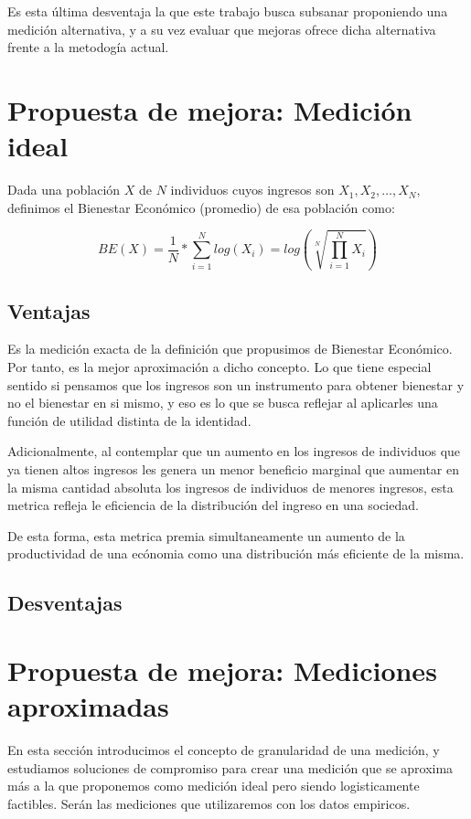 \documentclass[11pt,a4paper]{tesis}
\begin{document}
Es esta última desventaja la que este trabajo busca subsanar proponiendo una medición alternativa, y a su vez evaluar que mejoras ofrece dicha alternativa frente a la metodogía actual.

\section{Propuesta de mejora: Medición ideal}

Dada una población $X$ de $N$ individuos cuyos ingresos son $X_1, X_2, \dots, X_N$, definimos el Bienestar Económico (promedio) de esa población como:

$$
    BE(X) = \frac{1}{N} * \sum_{i=1}^N log(X_i) = log(\sqrt[N]{\prod_{i=1}^N X_i})
$$

\subsection{Ventajas}

Es la medición exacta de la definición que propusimos de Bienestar Económico. Por tanto, es la mejor aproximación a dicho concepto. Lo que tiene especial sentido si pensamos que los ingresos son un instrumento para obtener bienestar y no el bienestar en si mismo, y eso es lo que se busca reflejar al aplicarles una función de utilidad distinta de la identidad.



Adicionalmente, al contemplar que un aumento en los ingresos de individuos que ya tienen altos ingresos les genera un menor beneficio marginal que aumentar en la misma cantidad absoluta los ingresos de individuos de menores ingresos, esta metrica refleja le eficiencia de la distribución del ingreso en una sociedad.



De esta forma, esta metrica premia simultaneamente un aumento de la productividad de una ecónomia como una distribución más eficiente de la misma.



\subsection{Desventajas}


\section{Propuesta de mejora: Mediciones aproximadas}

En esta sección introducimos el concepto de granularidad de una medición, y estudiamos soluciones de compromiso para crear una medición que se aproxima más a la que proponemos como medición ideal pero siendo logisticamente factibles.
Serán las mediciones que utilizaremos con los datos empiricos.
\end{document}
